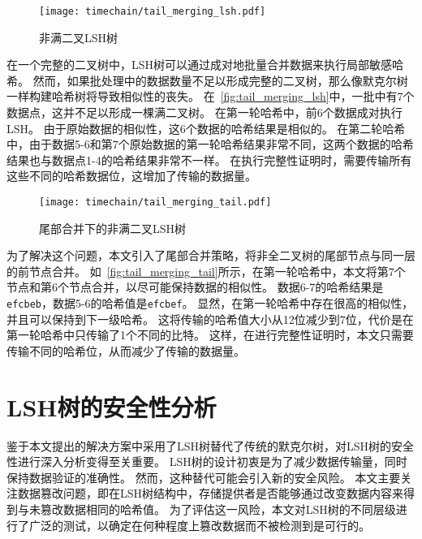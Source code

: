 \begin{figure}[t]
    \centering
	\begin{minipage}{0.8\linewidth}
        \centering
        \texttt{[image: timechain/tail\_merging\_lsh.pdf]}
        \caption{非满二叉LSH树}
        \label{fig:tail_merging_lsh}
	\end{minipage}
\end{figure}

在一个完整的二叉树中，LSH树可以通过成对地批量合并数据来执行局部敏感哈希。
然而，如果批处理中的数据数量不足以形成完整的二叉树，那么像默克尔树一样构建哈希树将导致相似性的丧失。
在~\autoref{fig:tail_merging_lsh}中，一批中有7个数据点，这并不足以形成一棵满二叉树。
在第一轮哈希中，前6个数据成对执行LSH。
由于原始数据的相似性，这6个数据的哈希结果是相似的。
在第二轮哈希中，由于数据5-6和第7个原始数据的第一轮哈希结果非常不同，这两个数据的哈希结果也与数据点1-4的哈希结果非常不一样。
在执行完整性证明时，需要传输所有这些不同的哈希数据位，这增加了传输的数据量。

\begin{figure}[t]
    \centering
	\begin{minipage}{0.8\linewidth}
        \centering
        \texttt{[image: timechain/tail\_merging\_tail.pdf]}
	\end{minipage}
	\caption{尾部合并下的非满二叉LSH树}
	\label{fig:tail_merging_tail}
\end{figure}
为了解决这个问题，本文引入了尾部合并策略，将非全二叉树的尾部节点与同一层的前节点合并。
如~\autoref{fig:tail_merging_tail}所示，在第一轮哈希中，本文将第7个节点和第6个节点合并，以尽可能保持数据的相似性。
数据6-7的哈希结果是\texttt{efcbeb}，数据5-6的哈希值是\texttt{efcbef}。
显然，在第一轮哈希中存在很高的相似性，并且可以保持到下一级哈希。
这将传输的哈希值大小从12位减少到7位，代价是在第一轮哈希中只传输了1个不同的比特。
这样，在进行完整性证明时，本文只需要传输不同的哈希位，从而减少了传输的数据量。

\section{LSH树的安全性分析}
鉴于本文提出的解决方案中采用了LSH树替代了传统的默克尔树，对LSH树的安全性进行深入分析变得至关重要。
LSH树的设计初衷是为了减少数据传输量，同时保持数据验证的准确性。
然而，这种替代可能会引入新的安全风险。
本文主要关注数据篡改问题，即在LSH树结构中，存储提供者是否能够通过改变数据内容来得到与未篡改数据相同的哈希值。
为了评估这一风险，本文对LSH树的不同层级进行了广泛的测试，以确定在何种程度上篡改数据而不被检测到是可行的。

